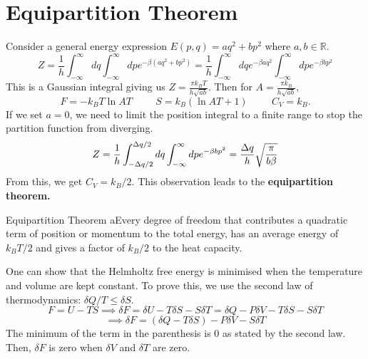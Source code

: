 \section{Equipartition Theorem}
    Consider a general energy expression $E(p,q)=aq^2+bp^2$ where $a,b\in\mathbb{R}$. 
    \begin{equation}
        Z = \frac{1}{h}\int_{-\infty}^\infty dq\int_{-\infty}^\infty dp e^{-\beta(aq^2+bp^2)}=\frac{1}{h}\int_{-\infty}^\infty dq e^{-\beta aq^2}\int_{-\infty}^\infty dpe^{-\beta bp^2}
    \end{equation}
    This is a Gaussian integral giving us $Z=\frac{\pi k_BT}{h\sqrt{ab}}$. Then for $A = \frac{\pi k_B}{h\sqrt{ab}}$,
    \begin{equation}
        F = -k_BT\ln AT \hspace{1cm} S = k_B(\ln AT+1)\hspace{1cm}C_V=k_B.
    \end{equation}
    If we set $a=0$, we need to limit the position integral to a finite range to stop the partition function from diverging. 
    \begin{equation}
        Z = \frac{1}{h}\int_{-\Delta q/2}^{\Delta q/2}dq\int_{-\infty}^\infty dp e^{-\beta bp^2}=\frac{\Delta q}{h}\sqrt{\frac{\pi}{b\beta}}
    \end{equation}
    From this, we get $C_V=k_B/2$. This observation leads to the \textbf{equipartition theorem.}
    \begin{theorem}{Equipartition Theorem}
        aEvery degree of freedom that contributes a quadratic term of position or momentum to the total energy, has an average energy of $k_BT/2$ and gives a factor of $k_B/2$ to the heat capacity.
    \end{theorem}
    One can show that the Helmholtz free energy is minimised when the temperature and volume are kept constant. To prove this, we use the second law of thermodynamics: $\delta Q / T \leq \delta S$.
    \begin{equation}
        F=U-TS \implies \delta F = \delta U - T\delta S - S\delta T = \delta Q -P \delta V -T\delta S -S\delta T
    \end{equation}
    \begin{equation}
        \implies \delta F = (\delta Q -T\delta S) - P\delta V - S\delta T
    \end{equation}
    The minimum of the term in the parenthesis is 0 as stated by the second law. Then, $\delta F$ is zero when $\delta V$ and $\delta T $ are zero. 
\newpage
